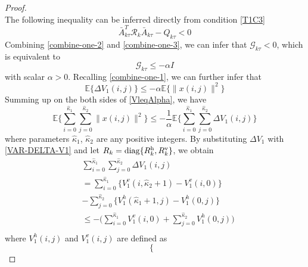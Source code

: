 \documentclass[conference]{IEEEtran}
\begin{document}
\begin{proof}
\begin{equation}
	\end{equation}
	The following inequality can be  inferred directly from condition \eqref{T1C3} 
	\begin{equation}\label{combine-one-3}
		\bar{A}^{T}_{k\tau }\mathcal{R}_{k}\bar{A}_{k\tau }-Q_{k\tau } < 0
	\end{equation}
	Combining \eqref{combine-one-2} and \eqref{combine-one-3}, we can infer that $\mathcal{G}_{k\tau }<0$, which is equivalent to 
	\begin{equation}
		\mathcal{G}_{k\tau } \leq -\alpha I
	\end{equation}
	with scalar $\alpha>0$.
	Recalling \eqref{combine-one-1}, we can further infer that
	\begin{equation}\label{VleqAlpha}
		\mathbb{E}\{\varDelta V_{1}(i,j) \} \leq-\alpha \mathbb{E}\{\|x(i,j)\|^{2} \}
	\end{equation}
	Summing up on the both sides of \eqref{VleqAlpha}, we have
	\begin{equation} \label{levE}
		\mathbb{E}\Big\{\sum_{i=0}^{\hat{\kappa}_{1}}\sum_{j=0}^{\hat{\kappa}_{2}}  \|x(i,j)\|^{2} \Big\} \leq -\frac{1}{\alpha} \mathbb{E}\Big\{\sum_{i=0}^{\hat{\kappa}_{1}}\sum_{j=0}^{\hat{\kappa}_{2}}  \varDelta V_{1}(i,j)  \Big\}
	\end{equation}
	where parameters $\hat{\kappa}_{1}$, $\hat{\kappa}_{2}$ are any positive integers. By substituting $\varDelta V_{1}$ with \eqref{VAR-DELTA-V1} and let $R_{k}=\mathrm{diag}\{R^{\rm{h}}_{k},R^{\rm{v}}_{k}\}$, we obtain
	\begin{equation} \label{Vhv}
		\begin{split}
			&\sum_{i=0}^{\hat{\kappa}_{1}}\sum_{j=0}^{\hat{\kappa}_{2}}  \varDelta V_{1}(i,j)\\&= \sum_{i=0}^{\hat{\kappa}_{1}}\big\{V^{v}_{1}(i,\hat{\kappa}_{2}+1) - V^{v}_{1}(i,0) \big\}\\
			&-  \sum_{j=0}^{\hat{\kappa}_{2}}\big\{V^{h}_{1}(\hat{\kappa}_{1}+1,j) - V^{h}_{1}(0,j) \big\}\\
			&\leq -\big( \sum_{i=0}^{\hat{\kappa}_{1}}V^{v}_{1}(i,0) + \sum_{j=0}^{\hat{\kappa}_{2}}V^{h}_{1}(0,j)\big) \\
		\end{split}
	\end{equation} 
	where $V_{1}^{h}(i,j)$ and $V_{1}^{v}(i,j)$ are defined as   
	\begin{equation*}
	\left\{
	\begin{array}{lr}

\end{array}
\end{equation*}
\end{proof}
\end{document}

